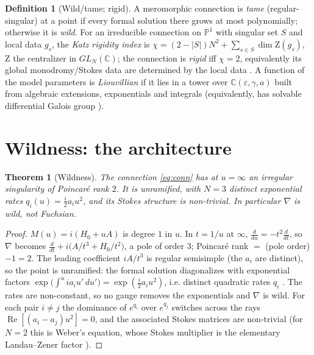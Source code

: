 \documentclass[11pt]{article}
\newtheorem{theorem}{Theorem}
\theoremstyle{definition}
\newtheorem{definition}{Definition}
\theoremstyle{remark}
\newcommand{\eps}{\varepsilon}
\newcommand{\C}{\mathbb{C}}
\newcommand{\PP}{\mathbb{P}^1}
\newcommand{\Stab}{\mathrm{Z}}
\renewcommand{\Re}{\operatorname{Re}}
\begin{document}
\begin{definition}[Wild/tame; rigid]\label{def:terms}
A meromorphic connection is \emph{tame} (regular-singular) at a point if every formal
solution there grows at most polynomially; otherwise it is \emph{wild}. For an irreducible
connection on $\PP$ with singular set $S$ and local data $g_s$, the \emph{Katz rigidity
index} is $\chi=(2-|S|)N^2+\sum_{s\in S}\dim \Stab(g_s)$, $\Stab$ the centralizer in
$GL_N(\C)$; the connection is \emph{rigid} iff $\chi=2$, equivalently its global
monodromy/Stokes data are determined by the local data \cite{Katz1996}. A function of the
model parameters is \emph{Liouvillian} if it lies in a tower over $\C(\eps,\gamma,a)$ built
from algebraic extensions, exponentials and integrals (equivalently, has solvable
differential Galois group \cite{Kolchin1973,vdPS2003}).
\end{definition}

\section{Wildness: the architecture}\label{sec:wild}

\begin{theorem}[Wildness]\label{thm:wild}
The connection \eqref{eq:conn} has at $u=\infty$ an irregular singularity of Poincar\'e
rank $2$. It is \emph{unramified}, with $N{=}3$ distinct exponential rates
$q_i(u)=\tfrac{i}{2}a_i u^2$, and its Stokes structure is non-trivial. In particular
$\nabla$ is wild, not Fuchsian.
\end{theorem}

\begin{proof}
$M(u)=i(H_0+uA)$ is degree $1$ in $u$. In $t=1/u$ at $\infty$, $\frac{d}{du}=-t^2\frac{d}{dt}$,
so $\nabla$ becomes $\frac{d}{dt}+i\big(A/t^{3}+H_0/t^{2}\big)$, a pole of order $3$;
Poincar\'e rank $=$ (pole order)$-1=2$. The leading coefficient $iA/t^3$ is regular semisimple
(the $a_i$ are distinct), so the point is unramified: the formal solution diagonalizes with
exponential factors $\exp\!\big(\int^{u} i a_i u'\,du'\big)=\exp(\tfrac{i}{2}a_i u^2)$, i.e.
distinct quadratic rates $q_i$ \cite{Wasow1965}. The rates are non-constant, so no gauge
removes the exponentials and $\nabla$ is wild. For each pair $i\neq j$ the dominance of
$e^{q_i}$ over $e^{q_j}$ switches across the rays $\Re[(a_i-a_j)u^2]=0$, and the associated
Stokes matrices are non-trivial (for $N{=}2$ this is Weber's equation, whose Stokes
multiplier is the elementary Landau--Zener factor \cite{JMU1981}).
\end{proof}
\end{document}
